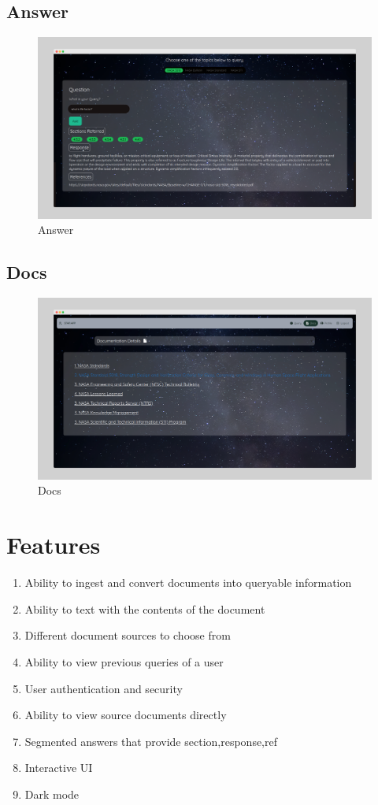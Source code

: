 \documentclass[11pt]{article}
\begin{document}
\subsection{Answer}
\begin{figure}[H]
	\centering
	\includegraphics[width=.95\textwidth]{./answer.png}
	\caption{Answer}
\end{figure}
\subsection{Docs}
\begin{figure}[H]
	\centering
	\includegraphics[width=.95\textwidth]{./doc.png}
	\caption{Docs}
\end{figure}

\section{Features}
\begin{enumerate}
	\item Ability to ingest and convert documents into queryable information
	\item Ability to text with the contents of the document
	\item Different document sources to choose from
	\item Ability to view previous queries of a user
	\item User authentication and security
	\item Ability to view source documents directly
	\item Segmented answers that provide section,response,ref
	\item Interactive UI
	\item Dark mode
\end{enumerate}
\end{document}
